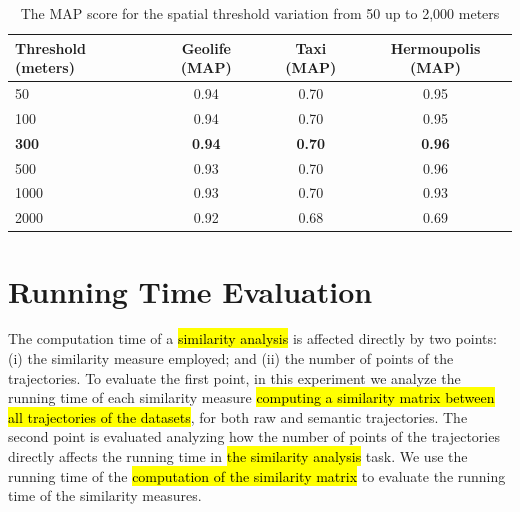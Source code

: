 


\begin{table}[ht!]
  \scriptsize
  \centering
  \begin{tabular}{|l|c|c|c|}
  \hline
Threshold (meters) & Geolife (MAP) & Taxi (MAP) & Hermoupolis (MAP)\\
  \hline
50 & {0.94} & 0.70 & 0.95\\
100 & {0.94} & 0.70 & 0.95\\
\textbf{300} & \textbf{0.94} & \textbf{0.70} & \textbf{0.96} \\
500 & 0.93 & 0.70 & {0.96}\\
1000 & 0.93 & 0.70 & 0.93\\
2000 & 0.92 & 0.68 & 0.69\\
    \hline
  \end{tabular}
  \caption{The MAP score for the spatial threshold variation from 50 up to 2,000 meters}
  \label{tab:sensibility_spatial_thresholds}
\end{table}


\section{Running Time Evaluation}\label{sec:running_time}

The computation time of a \hl{similarity analysis} is affected directly by two points: (i) the similarity measure employed; and (ii) the number of points of the trajectories. To evaluate the first point, in this experiment we analyze the running time of each similarity measure \hl{computing a similarity matrix between all trajectories of the datasets}, for both raw and semantic trajectories. The second point is evaluated analyzing how the number of points of the trajectories directly affects the running time in \hl{the similarity analysis} task. We use the running time of the \hl{computation of the similarity matrix}
to evaluate the running time of the similarity measures.

